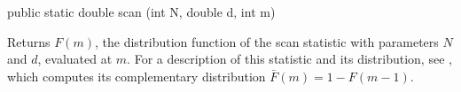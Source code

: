 
\begin{code}

   public static double scan (int N, double d, int m)\begin{hide} {
      return 1.0 - FBar.scan (N, d, m);
   }
}\end{hide}
\end{code}
 \begin{tabb} Returns $F (m)$, the distribution function of the scan statistic
  with parameters $N$ and $d$, evaluated at $m$.
  For a description of this statistic and its distribution, see
  ,
  which computes its complementary distribution
  $\bar F (m) = 1 - F (m-1)$.
 \end{tabb}
\begin{htmlonly}
\end{htmlonly}
